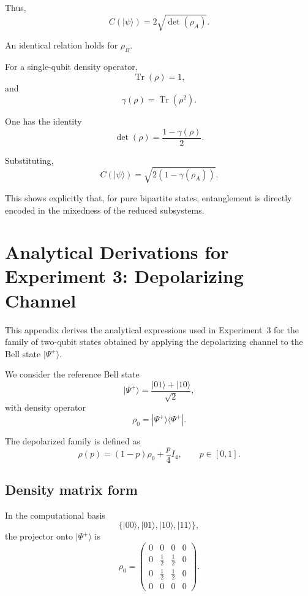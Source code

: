 \documentclass[a4paper]{article}
\begin{document}
Thus,
\[
C(|\psi\rangle)=2\sqrt{\det(\rho_A)}.
\]

An identical relation holds for \(\rho_B\).

For a single-qubit density operator,
\[
\operatorname{Tr}(\rho)=1,
\]
and
\[
\gamma(\rho)=\operatorname{Tr}(\rho^2).
\]

One has the identity
\[
\det(\rho)
=
\frac{1 - \gamma(\rho)}{2}.
\]

Substituting,
\[
C(|\psi\rangle)
=
\sqrt{2\left(1 - \gamma(\rho_A)\right)}.
\]

This shows explicitly that, for pure bipartite states, entanglement is directly encoded in the mixedness of the reduced subsystems.


\section{Analytical Derivations for Experiment 3: Depolarizing Channel}

This appendix derives the analytical expressions used in Experiment~3 for the family of two-qubit states obtained by applying the depolarizing channel to the Bell state \( |\Psi^+\rangle \).

We consider the reference Bell state
\[
|\Psi^+\rangle = \frac{|01\rangle + |10\rangle}{\sqrt{2}},
\]
with density operator
\[
\rho_0 = |\Psi^+\rangle\langle\Psi^+|.
\]

The depolarized family is defined as
\[
\rho(p)
=
(1-p)\rho_0 + \frac{p}{4}I_4,
\qquad
p \in [0,1].
\]


\subsection*{Density matrix form}

In the computational basis
\[
\{|00\rangle, |01\rangle, |10\rangle, |11\rangle\},
\]
the projector onto \( |\Psi^+\rangle \) is
\[
\rho_0
=
\begin{pmatrix}
0 & 0 & 0 & 0\\
0 & \frac12 & \frac12 & 0\\
0 & \frac12 & \frac12 & 0\\
0 & 0 & 0 & 0
\end{pmatrix}.
\]
\end{document}
